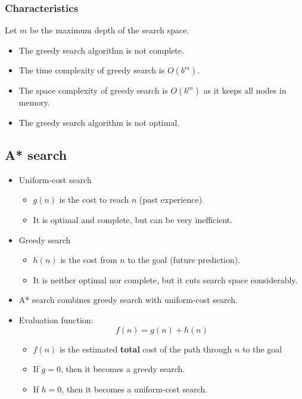 \documentclass[11pt]{article}
\begin{document}
\subsubsection{Characteristics}
\label{sec:org2ba5b2a}
Let \(m\) be the maximum depth of the search space.
\begin{itemize}
\item The greedy search algorithm is not complete.
\item The time complexity of greedy search is \(O(b^m)\).
\item The space complexity of greedy search is \(O(b^m)\) as it keeps all nodes in memory.
\item The greedy search algorithm is not optimal.
\end{itemize}

 \newpage
\subsection{A* search}
\label{sec:org9fbc281}
\begin{itemize}
\item Uniform-cost search
\begin{itemize}
\item \(g(n)\) is the cost to reach \(n\) (past experience).
\item It is optimal and complete, but can be very inefficient.
\end{itemize}
\item Greedy search
\begin{itemize}
\item \(h(n)\) is the cost from \(n\) to the goal (future prediction).
\item It is neither optimal nor complete, but it cuts search space considerably.
\end{itemize}
\item A* search combines greedy search with uniform-cost search.
\item Evaluation function:
\[f(n) = g(n) + h(n)\]

\begin{itemize}
\item \(f(n)\) is the estimated \textbf{total} cost of the path through \(n\) to the goal
\item If \(g = 0\), then it becomes a greedy search.
\item If \(h = 0\), then it becomes a uniform-cost search.
\end{itemize}
\end{itemize}
\end{document}
